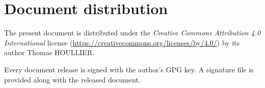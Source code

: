\documentclass[letterpaper]{article}
\begin{document}
\section*{Document distribution}
The present document is distributed under the \emph{Creative Commons Attribution
4.0 International} license (\url{https://creativecommons.org/licenses/by/4.0/})
by its author Thomas HOULLIER.

Every document release is signed with the author's GPG key. A signature file
is provided along with the released document.

\tableofcontents
\printglossary[type=\acronymtype,style=index]
\pagestyle{plain}





\appendix


\apptocmd{\thebibliography}{\raggedright}{}{}
\begingroup
{}
\setlength\bibitemsep{0pt}
\printbibliography
\endgroup
\end{document}
